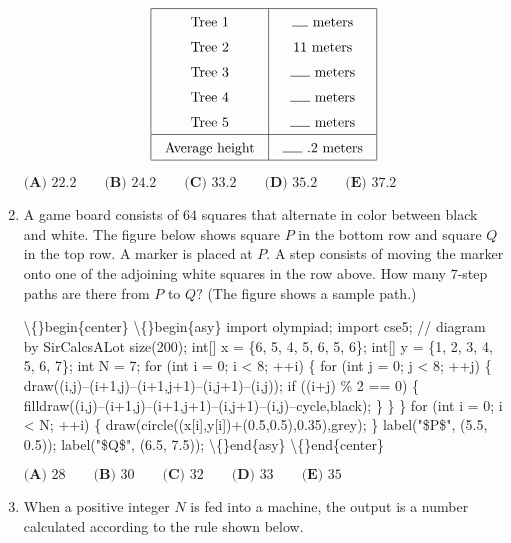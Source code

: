 \documentclass{article}
\begin{document}
\begin{enumerate}[label=\arabic*., itemsep=0.5em]
\begin{equation*}
\begingroup
\setlength{\tabcolsep}{10pt}
\renewcommand{\arraystretch}{1.5}
\begin{tabular}{|c|c|}
\hline Tree 1 & \rule{0.4cm}{0.15mm} meters \\
Tree 2 & 11 meters \\
Tree 3 & \rule{0.5cm}{0.15mm} meters \\
Tree 4 & \rule{0.5cm}{0.15mm} meters \\
Tree 5 & \rule{0.5cm}{0.15mm} meters \\ \hline
Average height & \rule{0.5cm}{0.15mm}\text{ .}2 meters \\
\hline
\end{tabular}
\endgroup
\end{equation*}

\(\textbf{(A) }22.2 \qquad \textbf{(B) }24.2 \qquad \textbf{(C) }33.2 \qquad \textbf{(D) }35.2 \qquad \textbf{(E) }37.2\)\par \vspace{0.5em}\item A game board consists of \(64\) squares that alternate in color between black and white. The figure below shows square \(P\) in the bottom row and square \(Q\) in the top row. A marker is placed at \(P.\) A step consists of moving the marker onto one of the adjoining white squares in the row above. How many \(7\)-step paths are there from \(P\) to \(Q?\) (The figure shows a sample path.)


\textbackslash\{\}begin\{center\}
\textbackslash\{\}begin\{asy\}
import olympiad;
import cse5;
// diagram by SirCalcsALot
size(200);
int[] x = \{6, 5, 4, 5, 6, 5, 6\};
int[] y = \{1, 2, 3, 4, 5, 6, 7\};
int N = 7;
for (int i = 0; i < 8; ++i) \{
for (int j = 0; j < 8; ++j) \{
draw((i,j)--(i+1,j)--(i+1,j+1)--(i,j+1)--(i,j));
if ((i+j) \% 2 == 0) \{
filldraw((i,j)--(i+1,j)--(i+1,j+1)--(i,j+1)--(i,j)--cycle,black);
\}
\}
\}
for (int i = 0; i < N; ++i) \{
draw(circle((x[i],y[i])+(0.5,0.5),0.35),grey);
\}
label("\$P\$", (5.5, 0.5));
label("\$Q\$", (6.5, 7.5));
\textbackslash\{\}end\{asy\}
\textbackslash\{\}end\{center\}


\(\textbf{(A) }28 \qquad \textbf{(B) }30 \qquad \textbf{(C) }32 \qquad \textbf{(D) }33 \qquad \textbf{(E) }35\)\par \vspace{0.5em}\item When a positive integer \(N\) is fed into a machine, the output is a number calculated according to the rule shown below.



\end{enumerate}
\end{document}
